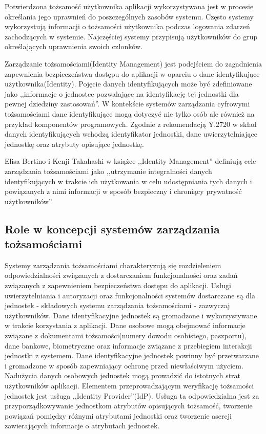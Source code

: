 	Potwierdzona tożsamość użytkownika aplikacji wykorzystywana jest w procesie określania jego uprawnień do poszczególnych zasobów systemu. Często systemy wykorzystują informacji o tożsamości użytkownika podczas logowania zdarzeń zachodzących w systemie. Najczęściej systemy przypisują użytkowników do grup określających uprawnienia swoich członków.



\label{sec:konceptcjaIdM}

	Zarządzanie tożsamościami(Identity Management) jest podejściem do zagadnienia zapewnienia bezpieczeństwa dostępu do aplikacji w oparciu o dane identyfikujące użytkownika(Identity). Pojęcie danych identyfikujących może być zdefiniowane jako ,,informacje o jednostce pozwalające na identyfikację tej jednostki dla pewnej dziedziny zastosowań''\cite{Itu09}. W kontekście systemów zarządzania cyfrowymi tożsamościami dane identyfikujące mogą dotyczyć nie tylko osób ale również na przykład komponentów programowych\cite{Bertino11}. Zgodnie z rekomendacją Y.2720 w skład danych identyfikujących wchodzą identyfikator jednostki, dane uwierzytelniające jednostkę oraz atrybuty opisujące jednostkę\cite{Itu09}.

	Elisa Bertino i Kenji Takahashi w książce ,,Identity Management'' definiują cele zarządzania tożsamościami jako ,,utrzymanie integralności danych identyfikujących w trakcie ich użytkowania w celu udostępniania tych danych i powiązanych z nimi informacji w sposób bezpieczny i chroniący prywatność użytkowników''\cite{Bertino11}.
	 
	\subsection{Role w koncepcji systemów zarządzania tożsamościami}

		Systemy zarządzania tożsamościami charakteryzują się rozdzieleniem odpowiedzialności związanych z dostarczaniem funkcjonalności oraz zadań związanych z zapewnieniem bezpieczeństwa dostępu do aplikacji. Usługi uwierzytelniania i autoryzacji oraz funkcjonalności systemów dostarczane są dla jednostek - składowych systemu zarządzania tożsamościami - zazwyczaj użytkowników.
		Dane identyfikacyjne jednostek są gromadzone i wykorzystywane w trakcie korzystania z aplikacji. Dane osobowe mogą obejmować informacje związane z dokumentami tożsamości(numery dowodu osobistego, paszportu), dane bankowe, biometryczne oraz informacje związane z przebiegiem interakcji jednostki z systemem. Dane identyfikacyjne jednostek powinny być przetwarzane i gromadzone w sposób zapewniający  ochronę przed niewłaściwym użyciem. Nadużycia danych osobowych jednostek mogą prowadzić do istotnych strat użytkowników aplikacji.
		Elementem przeprowadzającym weryfikację tożsamości jednostek jest usługa ,,Identity Provider''(IdP). Usługa ta odpowiedzialna jest za przyporządkowywanie jednostkom atrybutów opisujących tożsamość, tworzenie powiązań pomiędzy różnymi atrybutami jednostki oraz tworzenie asercji zawierających informacje o atrybutach jednostek. 

